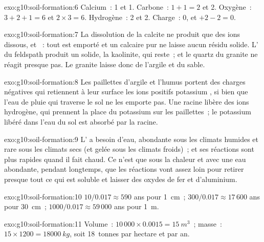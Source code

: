 \begin{solution}{exo:g10:soil-formation:6}
Calcium~: 1 et 1. Carbone~: $1 + 1 = 2$ et 2. Oxygène~: $3 + 2 + 1 = 6$ et
$2 \times 3 = 6$. Hydrogène~: 2 et 2. Charge~: 0, et $+2 - 2 = 0$.
\end{solution}

\begin{solution}{exo:g10:soil-formation:7}
La dissolution de la calcite ne produit que des ions dissous,  et
~: tout est emporté et un calcaire pur ne laisse aucun résidu
solide. L' du feldspath produit un solide, la kaolinite, qui
reste~; et le quartz du granite ne réagit presque pas. Le granite laisse donc
de l'argile et du sable.
\end{solution}

\begin{solution}{exo:g10:soil-formation:8}
Les paillettes d'argile et l'humus portent des charges négatives qui
retiennent à leur surface les ions positifs potassium , si bien que
l'eau de pluie qui traverse le sol ne les emporte pas. Une racine libère des
ions hydrogène, qui prennent la place du potassium sur les paillettes~; le
potassium libéré dans l'eau du sol est absorbé par la racine.
\end{solution}

\begin{solution}{exo:g10:soil-formation:9}
L' a besoin d'eau, abondante sous les climats humides et
rare sous les climats secs (et gelée sous les climats froids)~; et ses
réactions sont plus rapides quand il fait chaud. Ce n'est que sous la
chaleur et avec une eau abondante, pendant longtemps, que les réactions vont
assez loin pour retirer presque tout ce qui est soluble et laisser des
oxydes de fer et d'aluminium.
\end{solution}

\begin{solution}{exo:g10:soil-formation:10}
$10/0.017 \approx 590$ ans pour \qty{1}{cm}~; $300/0.017 \approx 17\,600$
ans pour \qty{30}{cm}~; $1000/0.017 \approx 59\,000$ ans pour \qty{1}{m}.
\end{solution}

\begin{solution}{exo:g10:soil-formation:11}
Volume~: $10\,000 \times 0.0015 = \qty{15}{m^3}$~; masse~: $15 \times 1200 =
\qty{18000}{kg}$, soit \num{18}~tonnes par hectare et par an.
\end{solution}

